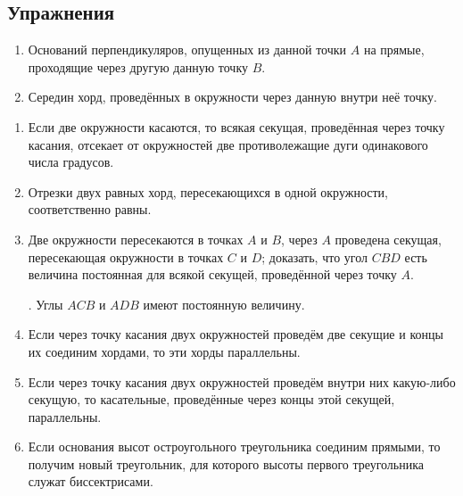 {\small

\subsection*{Упражнения}

\begin{center}
\end{center}

\begin{enumerate}[noitemsep]


\item
Оснований перпендикуляров, опущенных из данной точки $A$ на прямые, проходящие через другую данную точку $B$.

\item
Середин хорд, проведённых в окружности через данную внутри неё точку.

\end{enumerate}

\begin{center}
\end{center}

\begin{enumerate}

\item
Если две окружности касаются, то всякая секущая, проведённая через точку касания, отсекает от окружностей две противолежащие дуги одинакового числа градусов.

\item
Отрезки двух равных хорд, пересекающихся в одной окружности, соответственно равны.

\item
Две окружности пересекаются в точках $A$ и $B$, через $A$ проведена секущая, пересекающая окружности в точках $C$ и $D$;
доказать, что угол $CBD$ есть величина постоянная для всякой секущей, проведённой через точку $A$.

\smallskip
{}.
Углы $ACB$ и $ADB$ имеют постоянную величину.

\item
Если через точку касания двух окружностей проведём две секущие и концы их соединим хордами, то эти хорды параллельны.

\item
Если через точку касания двух окружностей проведём внутри них какую-либо секущую, то касательные, проведённые через концы этой секущей, параллельны.

\item
Если основания высот остроугольного треугольника соединим прямыми, то получим новый треугольник, для которого высоты первого треугольника служат биссектрисами. 


\end{enumerate}}
